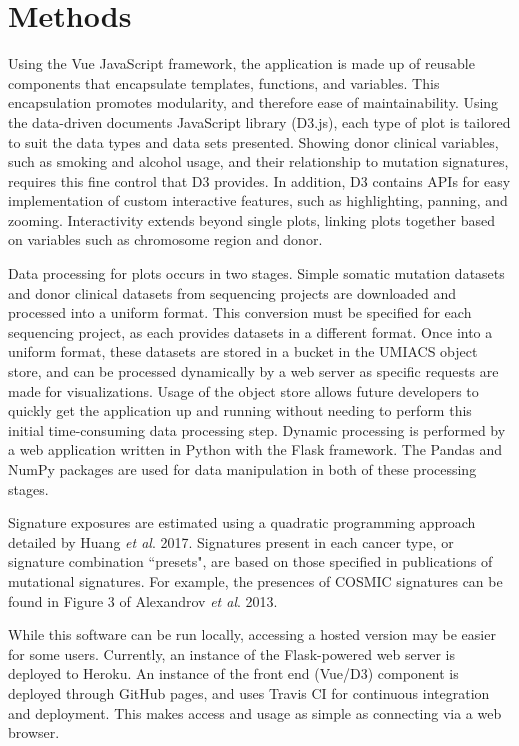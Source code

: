 \documentclass[12pt, letterpaper]{article}
\begin{document}


\section{Methods}
Using the Vue JavaScript framework, the application is made up of reusable components that encapsulate templates, functions, and variables.
This encapsulation promotes modularity, and therefore ease of maintainability.
Using the data-driven documents JavaScript library (D3.js)\cite{bostock2011d3}, each type of plot is tailored to suit the data types and data sets presented.
Showing donor clinical variables, such as smoking and alcohol usage, and their relationship to mutation signatures, requires this fine control that D3 provides.
In addition, D3 contains APIs for easy implementation of custom interactive features, such as highlighting, panning, and zooming.
Interactivity extends beyond single plots, linking plots together based on variables such as chromosome region and donor.

Data processing for plots occurs in two stages. 
Simple somatic mutation datasets and donor clinical datasets from sequencing projects are downloaded and processed into a uniform format. 
This conversion must be specified for each sequencing project, as each provides datasets in a different format.
Once into a uniform format, these datasets are stored in a bucket in the UMIACS object store, and can be processed dynamically by a web server as specific requests are made for visualizations.
Usage of the object store allows future developers to quickly get the application up and running without needing to perform this initial time-consuming data processing step.
Dynamic processing is performed by a web application written in Python with the Flask framework. 
The Pandas and NumPy packages are used for data manipulation in both of these processing stages.

Signature exposures are estimated using a quadratic programming approach detailed by Huang \textit{et al}. 2017\cite{huang2017detecting}.
Signatures present in each cancer type, or signature combination ``presets", are based on those specified in publications of mutational signatures.
For example, the presences of COSMIC signatures can be found in Figure 3 of Alexandrov \textit{et al}. 2013\cite{alexandrov2013signatures}.

While this software can be run locally, accessing a hosted version may be easier for some users.
Currently, an instance of the Flask-powered web server is deployed to Heroku.
An instance of the front end (Vue/D3) component is deployed through GitHub pages, and uses Travis CI for continuous integration and deployment.
This makes access and usage as simple as connecting via a web browser.
\end{document}
